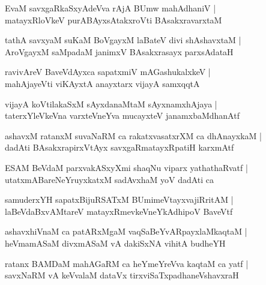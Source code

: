\documentclass[twoside,12pt,openright]{book}
\newcounter{shloka}[chapter]
\begin{document}
\begin{shloka}%
EvaM savxgaRkaSxyAdeVva rAjA BUmw mahAdhaniV |\\
matayxRloVkeV purABAyxsAtakxroVti BAsakxravarxtaM 
\end{shloka}

\begin{shloka}%
tathA savxyaM suKaM BoVgayxM laBateV divi shAshavxtaM |\\
AroVgayxM saMpadaM janimxV BAsakxrasayx parxsAdataH 
\end{shloka}

\begin{shloka}%
ravivAreV BaveVdAyxca sapatxmiV mAGashukalxkeV |\\
mahAjayeVti viKAyxtA anayxtarx vijayA samxqqtA 
\end{shloka}

\begin{shloka}%
vijayA koVtilakaSxM sAyxdanaMtaM sAyxnamxhAjaya |\\
taterxYleVkeVna varxteVneYva mucayxteV janamxbaMdhanAtf
\end{shloka}

\begin{shloka}%
ashavxM ratanxM suvaNaRM ca rakatxvasatxrXM ca dhAnayxkaM |\\
dadAti BAsakxrapirxVtAyx savxgaRmatayxRpatiH karxmAtf
\end{shloka}

\begin{shloka}%
ESAM  BeVdaM parxvakASxyXmi shaqNu viparx yathathaRvatf |\\
utatxmABareNeYruyxkatxM sadAvxhaM yoV dadAti ca 
\end{shloka}

\begin{shloka}%
samuderxYH sapatxBijuRSATxM BUmimeVtayxvajiRritAM |\\
laBeVdaBxvAMtareV matayxRmevkeVneYkAdhipoV BaveVtf
\end{shloka}

\begin{shloka}%
ashavxhiVnaM ca patARxMgaM vaqSaBeYvARpayxlaMkaqtaM |\\
heVmamASaM divxmASaM vA dakiSxNA vihitA budheYH
\end{shloka}

\begin{shloka}%
ratanx BAMDaM mahAGaRM ca heYmeYreVva kaqtaM ca yatf |\\
savxNaRM vA keVvalaM dataVx tirxviSaTxpadhaneVshavxraH
\end{shloka}
\end{document}
